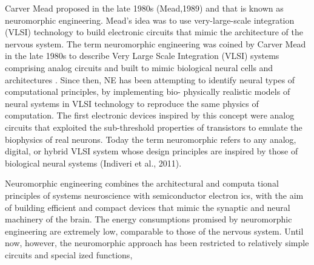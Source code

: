 
Carver Mead proposed in the late 1980s (Mead,1989) and that is known as neuromorphic engineering. Mead’s idea was to use very-large-scale integration (VLSI) technology to build electronic circuits that mimic the architecture of the nervous system.
The term neuromorphic engineering was coined by
Carver Mead in the late 1980s to describe Very Large Scale
Integration (VLSI) systems comprising analog circuits and
built to mimic biological neural cells and architectures
. Since then, NE has been attempting to identify neural
types of computational principles, by implementing bio-
physically realistic models of neural systems in VLSI
technology to reproduce the same physics of computation.
The first electronic devices inspired by this concept were analog circuits that exploited the sub-threshold properties of transistors to emulate the biophysics of real neurons.
Today the term neuromorphic refers to any analog, digital, or hybrid VLSI system whose design principles are inspired by those of biological neural systems (Indiveri et al., 2011).

Neuromorphic engineering combines the architectural and computa
tional principles of systems neuroscience with semiconductor electron
ics, with the aim of building efficient and compact devices that mimic the
synaptic and neural machinery of the brain. The energy consumptions
promised by neuromorphic engineering are extremely low, comparable
to those of the nervous system. Until now, however, the neuromorphic
approach has been restricted to relatively simple circuits and special
ized functions,

